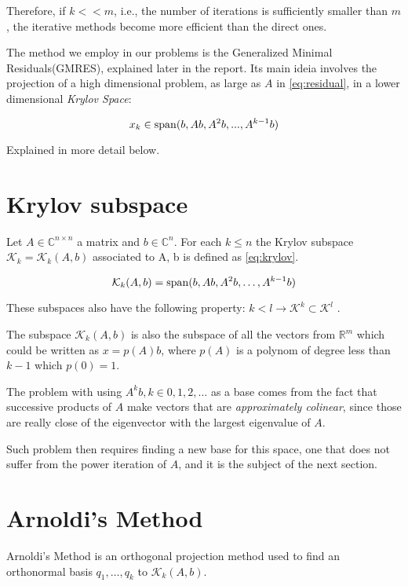 Therefore, if $k<<m$, i.e., the number of iterations is sufficiently smaller than $m$, the iterative methods become more efficient than the direct ones.


The method we employ in our problems is the Generalized Minimal Residuals(GMRES), explained later in the report. Its main ideia involves the projection of a high dimensional problem, as large as $A$ in \ref{eq:residual}, in a lower dimensional \textit{Krylov Space}:

\begin{equation}\label{eq:xkry}
    x_{k} \in \operatorname{span}(b,Ab,A^{2}b,...,A^{k-1}b)
\end{equation}

Explained in more detail below.

\section{Krylov subspace}
Let $A \in \mathbb{C}^{n \times n}$ a matrix and $b\in \mathbb{C}^{n}$. For each $k\leq n$ the Krylov subspace $\mathcal{K}_{k}=\mathcal{K}_{k}(A,b)$ associated to A, b is defined as \ref{eq:krylov}.

\begin{equation}\label{eq:krylov}
    \mathcal{K}_{k}(A,b) = \operatorname{span}(b,Ab,A^{2}b,\dots , A^{k-1}b)
\end{equation}

These subspaces also have the following property: $k<l \to \mathcal{K}^{k} \subset \mathcal{K}^{l}$ \cite{bonnet}.

The subspace $\mathcal{K}_{k}(A,b)$ is also the subspace of all the vectors from $\mathbb{R}^{m}$ which could be written as $x=p(A)b$, where $p(A)$ is a polynom of degree less than $k-1$ which $p(0)=1$.

The problem with using ${A^{k}b}, k \in {0,1,2,\dots}$ as a base comes from the fact that successive products of $A$ make vectors that are \textit{approximately colinear}, since those are really close of the eigenvector with the largest eigenvalue of $A$.

Such problem then requires finding a new base for this space, one that does not suffer from the power iteration of $A$, and it is the subject of the next section.

\section{Arnoldi's Method}


Arnoldi's Method is an orthogonal projection method used to find an orthonormal basis ${q_{1}, \dots, q_{k}}$ to $\mathcal{K}_{k}(A,b)$.

